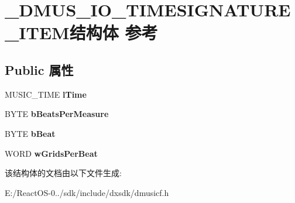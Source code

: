 \hypertarget{struct___d_m_u_s___i_o___t_i_m_e_s_i_g_n_a_t_u_r_e___i_t_e_m}{}\section{\+\_\+\+D\+M\+U\+S\+\_\+\+I\+O\+\_\+\+T\+I\+M\+E\+S\+I\+G\+N\+A\+T\+U\+R\+E\+\_\+\+I\+T\+E\+M结构体 参考}
\label{struct___d_m_u_s___i_o___t_i_m_e_s_i_g_n_a_t_u_r_e___i_t_e_m}
\subsection*{Public 属性}
\begin{DoxyCompactItemize}
\item 
\mbox{\label{struct___d_m_u_s___i_o___t_i_m_e_s_i_g_n_a_t_u_r_e___i_t_e_m_a7a326971fd17487e558ecf9ecc70c48a}} 
M\+U\+S\+I\+C\+\_\+\+T\+I\+ME {\bfseries l\+Time}
\item 
\mbox{\label{struct___d_m_u_s___i_o___t_i_m_e_s_i_g_n_a_t_u_r_e___i_t_e_m_acc5ace1fd9547c82072939362f4111cd}} 
B\+Y\+TE {\bfseries b\+Beats\+Per\+Measure}
\item 
\mbox{\label{struct___d_m_u_s___i_o___t_i_m_e_s_i_g_n_a_t_u_r_e___i_t_e_m_ab345efcc0337b0c0fdace230302045c6}} 
B\+Y\+TE {\bfseries b\+Beat}
\item 
\mbox{\label{struct___d_m_u_s___i_o___t_i_m_e_s_i_g_n_a_t_u_r_e___i_t_e_m_a3a8aaa1ca2820cded9613e9c993690aa}} 
W\+O\+RD {\bfseries w\+Grids\+Per\+Beat}
\end{DoxyCompactItemize}


该结构体的文档由以下文件生成\+:\begin{DoxyCompactItemize}
\item 
E\+:/\+React\+O\+S-\/0../sdk/include/dxsdk/dmusicf.\+h\end{DoxyCompactItemize}
